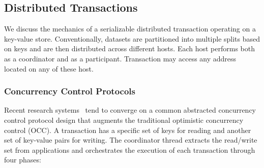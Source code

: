\subsection{Distributed Transactions}







We discuss the mechanics of a serializable distributed transaction operating on a key-value store. Conventionally, datasets are partitioned into multiple splits based on keys and are then distributed across different hosts. Each host performs both as a coordinator and as a participant. Transaction may access any address located on any of these host. 

\subsubsection{Concurrency Control Protocols}   \label{subsec:ccp}
Recent research systems~\cite{drtm, drtmh, farm, fasst, compromise} tend to converge on a common abstracted concurrency control protocol design that augments the traditional optimistic concurrency control (OCC). A transaction has a specific set of keys for reading and another set of key-value pairs for writing. The coordinator thread extracts the read/write set from applications and orchestrates the execution of each transaction through four phases:


